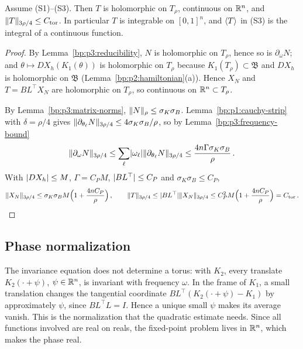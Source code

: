 \begin{lemma}\label{bp:p3:torsion-bound}
Assume (S1)--(S3). Then $T$ is holomorphic on $T_\rho$, continuous on $\mathbb{R}^n$, and
$\lVert T\rVert_{3\rho/4}\le C_{\mathrm{tor}}$. In particular $T$ is integrable on $[0,1]^n$, and $\langle T\rangle$ in
(S3) is the integral of a continuous function.
\end{lemma}

\begin{proof}
\label{step:p3:torsion-holomorphy}
By Lemma~\ref{bp:p3:reducibility}, $N$ is holomorphic on $T_\rho$, hence so is $\partial_\omega N$; and
$\theta\mapsto DX_h(K_1(\theta))$ is holomorphic on $T_\rho$ because $K_1(T_\rho)\subset\mathfrak B$ and
$DX_h$ is holomorphic on $\mathfrak B$ (Lemma~\ref{bp:p2:hamiltonian}(a)). Hence $X_N$ and $T=BL^\top X_N$ are holomorphic on $T_\rho$, so
continuous on $\mathbb{R}^n\subset T_\rho$.

\label{step:p3:torsion-bound-step}
By Lemma~\ref{bp:p3:matrix-norms}, $\lVert N\rVert_\rho\le\sigma_K\sigma_B$. Lemma~\ref{bp:p1:cauchy-strip}
with $\delta=\rho/4$ gives $\lVert \partial_{\theta_\ell}N\rVert_{3\rho/4}\le4\sigma_K\sigma_B/\rho$, so by
Lemma~\ref{bp:p3:frequency-bound}
\begin{equation*}
\lVert \partial_\omega N\rVert_{3\rho/4}\le\sum_\ell\lvert \omega_\ell\rvert\lVert \partial_{\theta_\ell}N\rVert_{3\rho/4}
\le\frac{4n\Gamma\sigma_K\sigma_B}{\rho}\,.
\end{equation*}
With $\lvert DX_h\rvert\le M$, $\Gamma=C_PM$, $\lvert BL^\top\rvert\le C_P$ and $\sigma_K\sigma_B\le C_P$,
\begin{equation*}
\lVert X_N\rVert_{3\rho/4}\le\sigma_K\sigma_BM\Bigl(1+\frac{4nC_P}{\rho}\Bigr)\,,\qquad
\lVert T\rVert_{3\rho/4}\le\lvert BL^\top\rvert\lVert X_N\rVert_{3\rho/4}\le C_P^2M\Bigl(1+\frac{4nC_P}{\rho}\Bigr)
=C_{\mathrm{tor}}\,.
\end{equation*}
\end{proof}

\subsection{Phase normalization}\label{bp:p3:phase-section}

The invariance equation does not determine a torus: with $K_2$, every translate $K_2(\cdot+\psi)$,
$\psi\in\mathbb{R}^n$, is invariant with frequency $\omega$. In the frame of $K_1$, a small translation changes
the tangential coordinate $BL^\top(K_2(\cdot+\psi)-K_1)$ by approximately $\psi$, since
$BL^\top L=I$. Hence a unique small $\psi$ makes its average vanish. This is the normalization that
the quadratic estimate needs. Since all functions involved are real on reals, the fixed-point problem
lives in $\mathbb{R}^n$, which makes the phase real.

